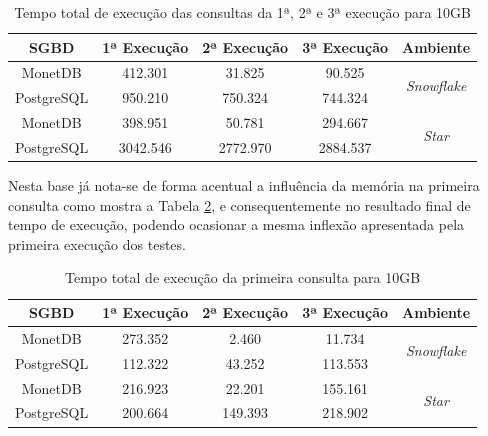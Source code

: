 \begin{table}[htpb]
        \centering
        \caption{Tempo total de execução das consultas da 1ª, 2ª e 3ª execução para 10GB}
        \label{tab:queries_cache_10}
        \begin{tabular}{|c|c|c|c|c|}
        \hline
        SGBD       & 1ª Execução & 2ª Execução & 3ª Execução & Ambiente                            \\ \hline
        MonetDB    & 412.301     & 31.825      & 90.525      & \multirow{2}{*}{\textit{Snowflake}} \\ \cline{1-4}
        PostgreSQL & 950.210     & 750.324     & 744.324     &                                     \\ \hline
        MonetDB    & 398.951     & 50.781      & 294.667     & \multirow{2}{*}{\textit{Star}}      \\ \cline{1-4}
        PostgreSQL & 3042.546    & 2772.970    & 2884.537    &                                     \\ \hline
        \end{tabular}
\end{table}

Nesta base já nota-se de forma acentual a influência da memória na primeira consulta como mostra a Tabela \ref{tab:q1_cache_10}, e consequentemente no resultado final de tempo de execução, podendo ocasionar a mesma inflexão apresentada pela primeira execução dos testes.

\begin{table}[htpb]
        \centering
        \caption{Tempo total de execução da primeira consulta para 10GB}
        \label{tab:q1_cache_10}
        \begin{tabular}{|c|c|c|c|c|}
        \hline
        SGBD       & 1ª Execução & 2ª Execução & 3ª Execução & Ambiente                            \\ \hline
        MonetDB    & 273.352     & 2.460       & 11.734      & \multirow{2}{*}{\textit{Snowflake}} \\ \cline{1-4}
        PostgreSQL & 112.322     & 43.252      & 113.553     &                                     \\ \hline
        MonetDB    & 216.923     & 22.201      & 155.161     & \multirow{2}{*}{\textit{Star}}      \\ \cline{1-4}
        PostgreSQL & 200.664     & 149.393     & 218.902     &                                     \\ \hline
        \end{tabular}
\end{table}

